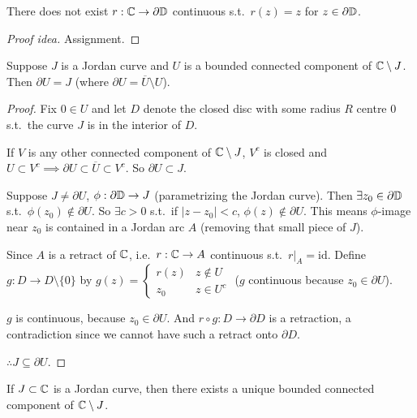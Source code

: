 \documentclass[11pt]{article}
\begin{document}
\begin{theorem}
There does not exist $r:{\mathbb{C}}\to\partial{\mathbb{D}}$ continuous s.t.\ $r(z)=z$ for $z\in\partial{\mathbb{D}}$.
\end{theorem}
\begin{proof}[Proof idea]
Assignment.
\end{proof}

\begin{lemma}
Suppose $J$ is a Jordan curve and $U$ is a bounded connected component of ${\mathbb{C}}\setminus J$. Then $\partial U = J$ (where $\partial U = \overline U\setminus U$).
\end{lemma}

\begin{proof}
Fix $0\in U$ and let $D$ denote the closed disc with some radius $R$ centre $0$ s.t.\ the curve $J$ is in the interior of $D$.

If $V$ is any other connected component of ${\mathbb{C}}\setminus J$, $V^c$ is closed and $U\subset V^c \implies \partial U \subset \overline U \subset V^c$. So $\partial U \subset J$.

Suppose $J\ne\partial U$, $\phi:\partial{\mathbb{D}}\to J$ (parametrizing the Jordan curve). Then $\exists z_0\in\partial{\mathbb{D}}$ s.t.\ $\phi(z_0)\notin\partial U$. So $\exists c>0$ s.t.\ if $|z-z_0|<c$, $\phi(z)\notin\partial U$. This means $\phi$-image near $z_0$ is contained in a Jordan arc $A$ (removing that small piece of $J$).

Since $A$ is a retract of ${\mathbb{C}}$, i.e.\ $r:{\mathbb{C}}\to A$ continuous s.t.\ $r|_A=\mathrm{id}$. Define $g:D\to D\setminus\{0\}$ by $g(z) = \begin{cases} r(z) & z\notin U \\ z_0 & z\in U^c \end{cases}$ ($g$ continuous because $z_0\in\partial U$).

$g$ is continuous, because $z_0\in\partial U$. And $r\circ g: D \to \partial D$ is a retraction, a contradiction since we cannot have such a retract onto $\partial D$.

$\therefore J\subseteq\partial U$.
\end{proof}

\begin{theorem}
If $J\subset{\mathbb{C}}$ is a Jordan curve, then there exists a unique bounded connected component of ${\mathbb{C}}\setminus J$.
\end{theorem}
\end{document}
